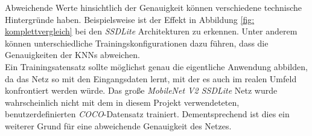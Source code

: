 Abweichende Werte hinsichtlich der Genauigkeit können verschiedene technische Hintergründe haben. Beispielsweise ist der Effekt in Abbildung \ref{fig: komplettvergleich} bei den \textit{SSDLite} Architekturen zu erkennen. Unter anderem können unterschiedliche Trainingskonfigurationen dazu führen, dass die Genauigkeiten der KNNs abweichen.\\

Ein Trainingsatensatz sollte möglichst genau die eigentliche Anwendung abbilden, da das Netz so mit den Eingangsdaten lernt, mit der es auch im realen Umfeld konfrontiert werden würde. Das große \textit{MobileNet V2 SSDLite} Netz wurde wahrscheinlich nicht mit dem in diesem Projekt verwendeteten, benutzerdefinierten \textit{COCO}-Datensatz trainiert. Dementsprechend ist dies ein weiterer Grund für eine abweichende Genauigkeit des Netzes.

